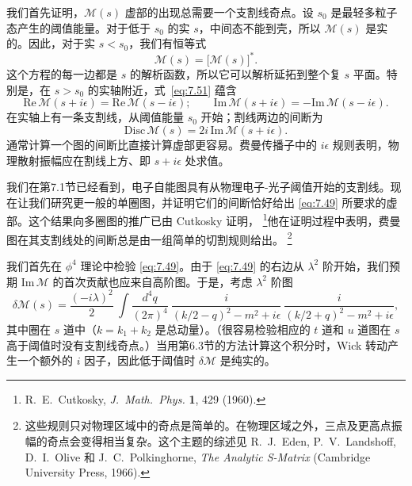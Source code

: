 我们首先证明，$\mathcal{M}(s)$ 虚部的出现总需要一个支割线奇点。设 $s_0$ 是最轻多粒子态产生的阈值能量。对于低于 $s_0$ 的实 $s$，中间态不能到壳，所以 $\mathcal{M}(s)$ 是实的。因此，对于实 $s < s_0$，我们有恒等式
\begin{equation}
  \mathcal{M}(s) = \bigl[ \mathcal{M}(s) \bigr]^{*} .
  \label{eq:7.51}
\end{equation}
这个方程的每一边都是 $s$ 的解析函数，所以它可以解析延拓到整个复 $s$ 平面。特别是，在 $s > s_0$ 的实轴附近，式~\eqref{eq:7.51} 蕴含
\begin{equation}
  \mathrm{Re}\,\mathcal{M}(s+i\epsilon) = \mathrm{Re}\,\mathcal{M}(s-i\epsilon);
  \qquad
  \mathrm{Im}\,\mathcal{M}(s+i\epsilon) = -\mathrm{Im}\,\mathcal{M}(s-i\epsilon).
\end{equation}
在实轴上有一条支割线，从阈值能量 $s_0$ 开始；割线两边的间断为
\begin{equation}
  \mathrm{Disc}\,\mathcal{M}(s) = 2i\,\mathrm{Im}\,\mathcal{M}(s+i\epsilon) .
\end{equation}
通常计算一个图的间断比直接计算虚部更容易。费曼传播子中的 $i\epsilon$ 规则表明，物理散射振幅应在割线上方、即 $s+i\epsilon$ 处求值。

我们在第7.1节已经看到，电子自能图具有从物理电子-光子阈值开始的支割线。现在让我们研究更一般的单圈图，并证明它们的间断恰好给出 \eqref{eq:7.49} 所要求的虚部。这个结果向多圈图的推广已由 Cutkosky 证明，%
\footnote{R.~E.~Cutkosky, \emph{J.\ Math.\ Phys.} \textbf{1}, 429 (1960).}他在证明过程中表明，费曼图在其支割线处的间断总是由一组简单的切割规则给出。%
\footnote{这些规则只对物理区域中的奇点是简单的。在物理区域之外，三点及更高点振幅的奇点会变得相当复杂。这个主题的综述见 R.~J.~Eden, P.~V.~Landshoff, D.~I.~Olive 和 J.~C.~Polkinghorne, \emph{The Analytic S-Matrix} (Cambridge University Press, 1966).}

我们首先在 $\phi^4$ 理论中检验 \eqref{eq:7.49}。由于 \eqref{eq:7.49} 的右边从 $\lambda^2$ 阶开始，我们预期 $\mathrm{Im}\,\mathcal{M}$ 的首次贡献也应来自高阶图。于是，考虑 $\lambda^2$ 阶图
\begin{equation}
  \delta\mathcal{M}(s) = \frac{(-i\lambda)^2}{2}\ \int
    \frac{d^4q}{(2\pi)^4}\ \frac{i}{(k/2-q)^2-m^2+i\epsilon}\
    \frac{i}{(k/2+q)^2-m^2+i\epsilon} ,
  \label{eq:7.52}
\end{equation}
其中圈在 $s$ 道中（$k = k_1+k_2$ 是总动量）。（很容易检验相应的 $t$ 道和 $u$ 道图在 $s$ 高于阈值时没有支割线奇点。）当用第6.3节的方法计算这个积分时，Wick 转动产生一个额外的 $i$ 因子，因此低于阈值时 $\delta\mathcal{M}$ 是纯实的。

